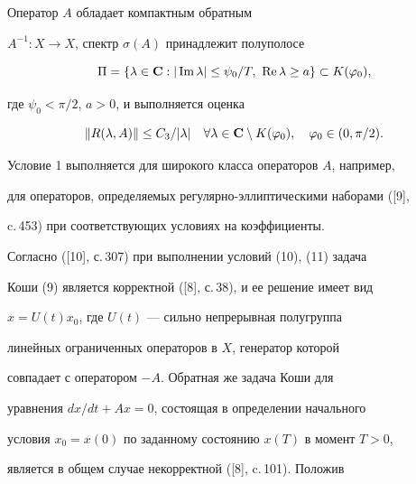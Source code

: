 \begin{cond}


Оператор $A$ обладает компактным обратным


$A^{-1}:X\to X$, спектр $\sigma(A)$ принадлежит полуполосе


\begin{equation}


\Pi = \{\lambda\in{\bold C}: | \im \lambda | \leq


\psi_0/T,\ \re \lambda \geq a \}\subset K(\varphi_0),


\end{equation}


где $\psi_0 < \pi/2$, $a>0$, и выполняется оценка


\begin{equation}


\Vert R(\lambda, A)\Vert \leq C_3/|\lambda|


\quad\forall\lambda\in{\bold C}\setminus K(\varphi_0), \quad


\varphi_0\in (0,\pi/2).


\end{equation}


\end{cond}





Условие 1 выполняется для широкого класса операторов $A$, например,


для операторов, определяемых регулярно-эллиптическими наборами ([9],


c.\,453) при соответствующих условиях на коэффициенты.





Согласно ([10], с.\,307) при выполнении условий (10), (11) задача


Коши (9) является корректной ([8], с.\,38), и ее решение имеет вид


$x = U(t) x_0$, где $U(t)$ --- сильно непрерывная полугруппа


линейных ограниченных операторов в $X$, генератор которой


совпадает с оператором $-A$. Обратная же задача Коши для


уравнения $dx/dt +Ax = 0$, состоящая в определении начального


условия $x_0=x(0)$ по заданному состоянию $x(T)$ в момент $T>0$,


является в общем случае некорректной ([8], c.\,101). Положив


